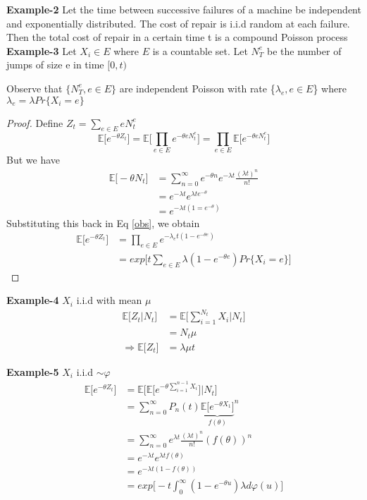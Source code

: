 \documentclass[a4paper,english,12pt]{article}
\begin{document}
\textbf{Example-2} Let the time between successive failures of a machine be independent and  exponentially distributed. The cost of repair is i.i.d random at each failure. Then the total cost of repair in a certain time t is a compound Poisson process\\

\textbf{Example-3} Let $X_i\in E$ where $E$ is a countable set. Let $N_T^e$  be the number of jumps of size e in time $[0,t)$
\begin{note}
	Observe that $\{N_T^e, e\in E\}$ are independent Poisson with rate \{$\lambda_e, e\in E$\}  where $\lambda_e=\lambda Pr\{X_i=e\}$
\end{note}
\begin{proof}
	Define $Z_t=\sum_{e\in E}eN_t^e$
	\begin{equation}\label{obs}
	\mathbb{E}\Big[e^{-\theta Z_t}\Big]=\mathbb{E}\Big[\prod_{e\in E}e^{-\theta e N_t^e}\Big]=\prod_{e\in E}\mathbb{E}\Big[e^{-\theta e N_t^e}\Big]
	\end{equation}
	But we have
	\begin{align*}
	\mathbb{E}\Big[-\theta N_t\Big] &= \sum_{n=0}^{\infty}e^{-\theta n}e^{-\lambda t}\frac{(\lambda t)^n}{n!}\\
	&= e^{-\lambda t} e^{\lambda te^{-\theta}}\\
	&= e^{-\lambda t(1=e^{-\theta})}
	\end{align*}
	Substituting this back in Eq \ref{obs}, we obtain
		\begin{align*}
		\mathbb{E}\Big[e^{-\theta Z_t}\Big] &= \prod_{e\in E}e^{-\lambda_et(1-e^{-\theta e})}\\
		&= exp\Big[t\sum_{e\in E}\lambda(1-e^{-\theta e})Pr\{X_i=e\}\Big]
		\end{align*}
\end{proof}

\textbf{Example-4} $X_i$ i.i.d with mean $\mu$
\begin{align*}
	\mathbb{E}\Big[Z_t|N_t\Big]&=\mathbb{E}\Big[\sum_{i=1}^{N_t}X_i|N_t\Big]\\
	&= N_t\mu\\
	\Rightarrow \mathbb{E}\Big[Z_t\Big]&=\lambda \mu t
\end{align*}

\textbf{Example-5} $X_i$ i.i.d $\sim \varphi$
\begin{align*}
	\mathbb{E}\Big[e^{-\theta Z_t}\Big] &= \mathbb{E}\Bigg[\mathbb{E}\Big[e^{-\theta\sum_{i=1}^{n-1}X_i}\Big]|N_t\Bigg]\\
	&= \sum_{n=0}^{\infty}P_n(t){\underbrace{\mathbb{E}\Big[e^{-\theta X_1}\Big]}_{f(\theta)}}^n\\
	&= \sum_{n=0}^{\infty}e^{\lambda t}\frac{(\lambda t)^n}{n!}(f(\theta))^n\\
	&= e^{-\lambda t}e^{\lambda t f(\theta)}\\
	&= e^{-\lambda t (1-f(\theta))}\\
	&= exp\Big[-t\int_{0}^{\infty}(1-e^{-\theta u})\lambda d\varphi(u)\Big]
\end{align*}
\end{document}
